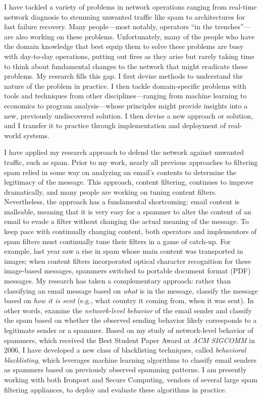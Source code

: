 I have tackled a variety of problems in network operations ranging from
real-time network diagnosis to stemming unwanted traffic like spam to
architectures for fast failure recovery.  Many people---most notably,
operators ``in the trenches''---are also working on these problems.
Unfortunately, many of the people who have the domain knowledge that
best equip them to solve these problems are busy with day-to-day
operations, putting out fires as they arise but rarely taking time to
think about fundamental changes to the network that might eradicate
these problems.  My research fills this gap.  I first devise methods to
understand the nature of the problem in practice.  I then tackle
domain-specific problems with tools and techniques from other
disciplines---ranging from machine learning to economics to program
analysis---whose principles might provide insights into a new,
previously undiscovered solution.  I then devise a new approach or
solution, and I transfer it to practice through implementation and
deployment of real-world systems.


I have applied my research approach to defend the network against
unwanted traffic, such as spam.  Prior to my work, nearly all previous
approaches to filtering spam relied in some way on analyzing an email's
contents to determine the legitimacy of the message.  This approach,
content filtering, continues to improve dramatically, and many people
are working on tuning content filters.  Nevertheless, the approach has a
fundamental shortcoming: email content is malleable, meaning that it is
very easy for a spammer to alter the content of an email to evade a
filter without changing the actual meaning of the message.  To keep pace
with continually changing content, both operators and implementors of
spam filters must continually tune their filters in a game of catch-up.
For example, last year saw a rise in spam whose main content was
transported in images; when content filters incorporated optical
character recognition for these image-based messages, spammers switched
to portable document format (PDF) messages.  My research has taken a
complementary approach: rather than classifying an email message based
on {\em what} is in the message, classify the message based on {\em how
it is sent} (e.g., what country it coming from, when it was sent).  In
other words, examine the {\em network-level behavior} of the email
sender and classify the spam based on whether the observed sending
behavior likely corresponds to a legitimate sender or a spammer.  Based
on my study of network-level behavior of spammers, which received the
Best Student Paper Award at {\em ACM SIGCOMM} in 2006, I have developed
a new class of blacklisting techniques, called {\em behavioral
blacklisting}, which leverages machine learning algorithms to classify
email senders as spammers based on previously observed spamming
patterns.  I am presently working with both Ironport and Secure
Computing, vendors of several large spam filtering appliances, to deploy
and evaluate these algorithms in practice.

